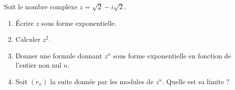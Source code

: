 
\begin{exercice}\label{exosmath-0285}

    Soit le nombre complexe \( z=\sqrt{2}-i\sqrt{2}\).
    \begin{enumerate}
        \item
            Écrire \( z\) sous forme exponentielle.
        \item
            Calculer \( z^2\).
        \item
            Donner une formule donnant \( z^n\) sous forme exponentielle en fonction de l'entier non nul \( n\).
        \item
            Soit \( (r_n)\) la suite donnée par les modules de \( z^n\). Quelle est sa limite ?
    \end{enumerate}

\end{exercice}
